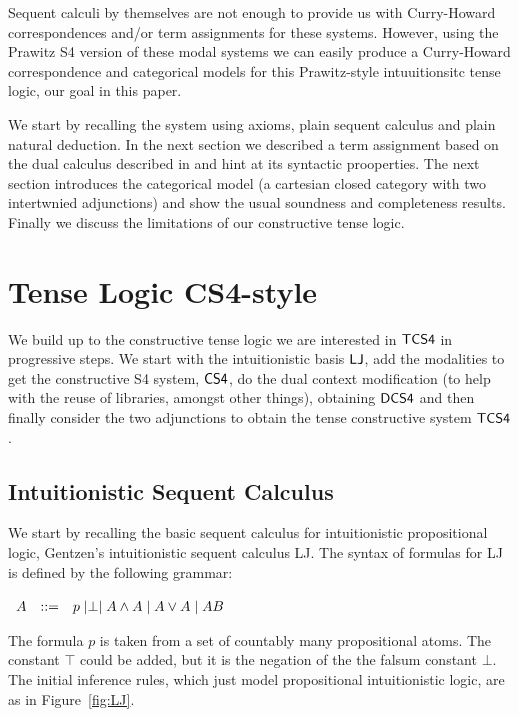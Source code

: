 \documentclass{article}
\let\to\relax
\newcommand{\to}{\rightarrow}
\begin{document}
Sequent calculi  by themselves are not enough to provide us with Curry-Howard correspondences and/or term assignments for these systems. However, using the Prawitz S4 version of these modal systems we can easily produce a Curry-Howard correspondence and categorical models for this Prawitz-style intuuitionsitc tense logic, our goal in this paper. 

We start by recalling the system using axioms, plain sequent calculus and plain natural deduction. In the next section we described a term assignment based on the dual calculus described in \cite{icalp1998} and hint at its syntactic prooperties. The next section  introduces the categorical model (a cartesian closed category with two intertwnied adjunctions) and show the usual soundness and completeness results. Finally we discuss the limitations of our constructive tense logic.

\section{Tense Logic CS4-style}
We build up to the constructive tense logic we are interested in $\sf{TCS4}$ in progressive steps. We start with the intuitionistic basis $\sf{LJ}$, add the modalities to get the constructive S4 system, $\sf{CS4}$, do the dual context modification (to help with the reuse of libraries, amongst other things), obtaining $\sf{DCS4}$ and then finally consider the two adjunctions to obtain the tense constructive system $\sf{TCS4}$.

\subsection{Intuitionistic Sequent Calculus}
We start by recalling the basic sequent calculus for intuitionistic propositional logic, 
Gentzen's intuitionistic sequent calculus LJ.  
The syntax of formulas for LJ is defined by the
following grammar:
\begin{center}
    \begin{math}
        \begin{array}{lllllllll}
            A & ::= & p \mid \perp \mid A \land A \mid A \lor A \mid A \to B
        \end{array}
    \end{math}
\end{center}
The formula $p$ is taken from a set of countably many  propositional atoms. The constant $\top$ could be added, but it is the negation of the the falsum constant $\bot$.
The  initial inference rules, which just model
propositional intuitionistic logic, are as in 
Figure~\ref{fig:LJ}.
\end{document}

